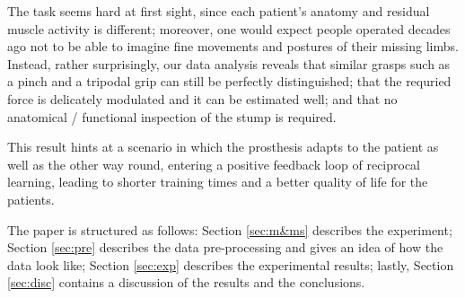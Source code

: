 The task seems hard at first sight, since each patient's anatomy and residual
muscle activity is different; moreover, one would expect people operated
decades ago not to be able to imagine fine movements and postures of their
missing limbs. Instead, rather surprisingly, our data analysis reveals that
similar grasps such as a pinch and a tripodal grip can still be perfectly
distinguished; that the requried force is delicately modulated and it can be
estimated well; and that no anatomical / functional inspection of the stump
is required.

This result hints at a scenario in which the prosthesis adapts to the patient
as well as the other way round, entering a positive feedback loop
of reciprocal learning, leading to shorter training times and a better
quality of life for the patients.

The paper is structured as follows: Section \ref{sec:m&ms} describes
the experiment; Section \ref{sec:pre} describes the data
pre-processing and gives an idea of how the data look like; Section
\ref{sec:exp} describes the experimental results; lastly, Section
\ref{sec:disc} contains a discussion of the results and the conclusions.
